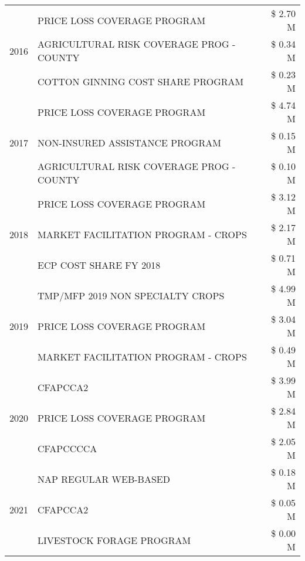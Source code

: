 \begin{tabular}{llr}
\cline{1-3}
\multirow[t]{3}{*}{2016} & PRICE LOSS COVERAGE PROGRAM & \$ 2.70 M \\
 & AGRICULTURAL RISK COVERAGE PROG - COUNTY & \$ 0.34 M \\
 & COTTON GINNING COST SHARE PROGRAM & \$ 0.23 M \\
\cline{1-3}
\multirow[t]{3}{*}{2017} & PRICE LOSS COVERAGE PROGRAM & \$ 4.74 M \\
 & NON-INSURED ASSISTANCE PROGRAM & \$ 0.15 M \\
 & AGRICULTURAL RISK COVERAGE PROG - COUNTY & \$ 0.10 M \\
\cline{1-3}
\multirow[t]{3}{*}{2018} & PRICE LOSS COVERAGE PROGRAM & \$ 3.12 M \\
 & MARKET FACILITATION PROGRAM - CROPS & \$ 2.17 M \\
 & ECP COST SHARE FY 2018 & \$ 0.71 M \\
\cline{1-3}
\multirow[t]{3}{*}{2019} & TMP/MFP 2019 NON SPECIALTY CROPS & \$ 4.99 M \\
 & PRICE LOSS COVERAGE PROGRAM & \$ 3.04 M \\
 & MARKET FACILITATION PROGRAM - CROPS & \$ 0.49 M \\
\cline{1-3}
\multirow[t]{3}{*}{2020} & CFAPCCA2 & \$ 3.99 M \\
 & PRICE LOSS COVERAGE PROGRAM & \$ 2.84 M \\
 & CFAPCCCCA & \$ 2.05 M \\
\cline{1-3}
\multirow[t]{3}{*}{2021} & NAP REGULAR WEB-BASED & \$ 0.18 M \\
 & CFAPCCA2 & \$ 0.05 M \\
 & LIVESTOCK FORAGE PROGRAM & \$ 0.00 M \\
\cline{1-3}
\bottomrule
\end{tabular}
